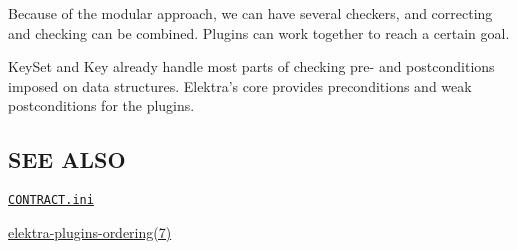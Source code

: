 Because of the modular approach, we can have several checkers, and correcting and checking can be combined. Plugins can work together to reach a certain goal.

{\ttfamily Key\+Set} and {\ttfamily Key} already handle most parts of checking pre-\/ and postconditions imposed on data structures. Elektra's core provides preconditions and weak postconditions for the plugins.

\subsection*{S\+E\+E A\+L\+S\+O}


\begin{DoxyItemize}
\item \href{/home/markus/Projekte/Elektra/current/doc/CONTRACT.ini}{\tt C\+O\+N\+T\+R\+A\+C\+T.\+ini}
\item \hyperlink{md_doc_help_elektra-plugins-ordering_doc_help_elektra-plugins-ordering_md}{elektra-\/plugins-\/ordering(7)} 
\end{DoxyItemize}
